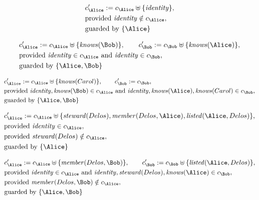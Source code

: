 \begin{align*}
&
c'_
{
\Alice
}
 := 
c_
{
\Alice
}
 \uplus 
\{
\mathit{
identity
}
\}
,\\
&
\text{provided } 
\mathit{
identity
}
 \notin c_
{
\Alice
}
,\\
&
\text{guarded by } \{
\Alice
\}
\end{align*}

\begin{align*}
&
c'_
{
\Alice
}
 := 
c_
{
\Alice
}
 \uplus 
\{
\mathit{
knows
}
(
\Bob
)
\}
, \qquad 
c'_
{
\Bob
}
 := 
c_
{
\Bob
}
 \uplus 
\{
\mathit{
knows
}
(
\Alice
)
\}
,\\
&
\text{provided } 
\mathit{
identity
}
 \in c_
{
\Alice
}
 \text{ and } 
\mathit{
identity
}
 \in c_
{
\Bob
}
,\\
&
\text{guarded by } \{
\Alice
,
\Bob
\}
\end{align*}

\begin{align*}
&
c'_
{
\Alice
}
 := 
c_
{
\Alice
}
 \uplus 
\{
\mathit{
knows
}
(
Carol
)
\}
, \qquad 
c'_
{
\Bob
}
 := 
c_
{
\Bob
}
,\\
&
\text{provided } 
\mathit{
identity
}
,
\mathit{
knows
}
(
\Bob
)
 \in c_
{
\Alice
}
 \text{ and } 
\mathit{
identity
}
,
\mathit{
knows
}
(
\Alice
)
,
\mathit{
knows
}
(
Carol
)
 \in c_
{
\Bob
}
,\\
&
\text{guarded by } \{
\Alice
,
\Bob
\}
\end{align*}

\begin{align*}
&
c'_
{
\Alice
}
 := 
c_
{
\Alice
}
 \uplus 
\{
\mathit{
steward
}
(
Delos
)
,
\mathit{
member
}
(
Delos
,
\Alice
)
,
\mathit{
listed
}
(
\Alice
,
Delos
)
\}
,\\
&
\text{provided } 
\mathit{
identity
}
 \in c_
{
\Alice
}
,\\
&
\text{provided } 
\mathit{
steward
}
(
Delos
)
 \notin c_
{
\Alice
}
,\\
&
\text{guarded by } \{
\Alice
\}
\end{align*}

\begin{align*}
&
c'_
{
\Alice
}
 := 
c_
{
\Alice
}
 \uplus 
\{
\mathit{
member
}
(
Delos
,
\Bob
)
\}
, \qquad 
c'_
{
\Bob
}
 := 
c_
{
\Bob
}
 \uplus 
\{
\mathit{
listed
}
(
\Alice
,
Delos
)
\}
,\\
&
\text{provided } 
\mathit{
identity
}
 \in c_
{
\Alice
}
 \text{ and } 
\mathit{
identity
}
,
\mathit{
steward
}
(
Delos
)
,
\mathit{
knows
}
(
\Alice
)
 \in c_
{
\Bob
}
,\\
&
\text{provided } 
\mathit{
member
}
(
Delos
,
\Bob
)
 \notin c_
{
\Alice
}
,\\
&
\text{guarded by } \{
\Alice
,
\Bob
\}
\end{align*}
